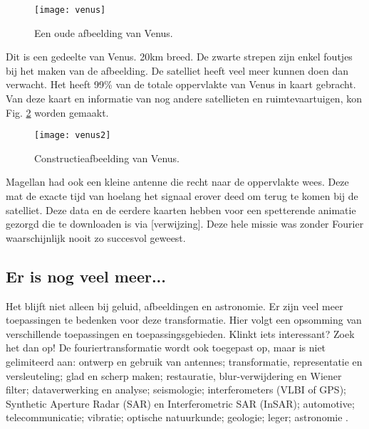\documentclass[11pt,fleqn]{book} %
\begin{document}
\begin{figure}[h]
	\centering\texttt{[image: venus]}
	\caption{Een oude afbeelding van Venus.}
	\label{fig:venus}
\end{figure}

Dit is een gedeelte van Venus. 20km breed. De zwarte strepen zijn enkel foutjes bij het maken van de afbeelding. De satelliet heeft veel meer kunnen doen dan verwacht. Het heeft 99\% van de totale oppervlakte van Venus in kaart gebracht. Van deze kaart en informatie van nog andere satellieten en ruimtevaartuigen, kon Fig. \ref{fig:venus2} worden gemaakt.

\begin{figure}[h]
	\centering\texttt{[image: venus2]}
	\caption{Constructieafbeelding van Venus.}
	\label{fig:venus2}
\end{figure}

Magellan had ook een kleine antenne die recht naar de oppervlakte wees. Deze mat de exacte tijd van hoelang het signaal erover deed om terug te komen bij de satelliet. Deze data en de eerdere kaarten hebben voor een spetterende animatie gezorgd die te downloaden is via [verwijzing]. Deze hele missie was zonder Fourier waarschijnlijk nooit zo succesvol geweest.

\subsection{Er is nog veel meer...}
Het blijft niet alleen bij geluid, afbeeldingen en astronomie. Er zijn veel meer toepassingen te bedenken voor deze transformatie. Hier volgt een opsomming van verschillende toepassingen en toepassingsgebieden. Klinkt iets interessant? Zoek het dan op!
De fouriertransformatie wordt ook toegepast op, maar is niet gelimiteerd aan: ontwerp en gebruik van antennes; transformatie, representatie en versleuteling; glad en scherp maken; restauratie, blur-verwijdering en Wiener filter; dataverwerking en analyse; seismologie; interferometers (VLBI of GPS); Synthetic Aperture Radar (SAR) en Interferometric SAR (InSAR); automotive; telecommunicatie; vibratie; optische natuurkunde; geologie; leger; astronomie \cite{in}\cite{gp}.

\end{document}
